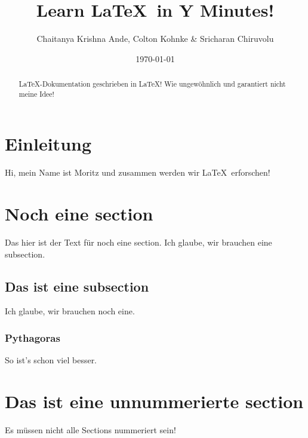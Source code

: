 \documentclass[12pt]{article}
\author{Chaitanya Krishna Ande, Colton Kohnke \& Sricharan Chiruvolu}
\date{\today}
\title{Learn \LaTeX\ in Y Minutes!}
\newcommand{\comment}[1]{}
\begin{document}
\comment{
  Dies ist unser selbst-definierter Befehl
  für mehrzeilige Kommentare.
}

\maketitle

\begin{abstract}
 \LaTeX -Dokumentation geschrieben in \LaTeX ! Wie ungewöhnlich und garantiert nicht meine Idee!
\end{abstract}

\section{Einleitung}
Hi, mein Name ist Moritz und zusammen werden wir \LaTeX\ erforschen!

\section{Noch eine section}
Das hier ist der Text für noch eine section. Ich glaube, wir brauchen eine subsection.

\subsection{Das ist eine subsection} %
Ich glaube, wir brauchen noch eine.

\subsubsection{Pythagoras}
So ist's schon viel besser.
\label{subsec:pythagoras}

\section*{Das ist eine unnummerierte section}
Es müssen nicht alle Sections nummeriert sein!
\end{document}
